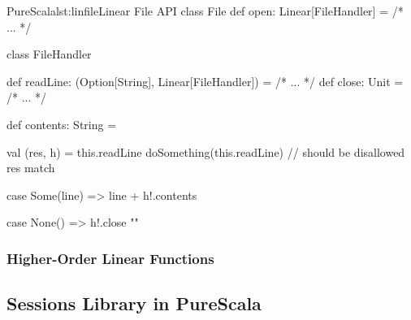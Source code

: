 \documentclass[a4paper,twoside]{article}
\newcommand{\stt}[1]{\texttt{\small{#1}}}
\begin{document}
\begin{Code}{PureScala}{lst:linfile}{Linear File API}
class File {
  def open: Linear[FileHandler] = /* ... */
}

class FileHandler {
  def readLine: (Option[String], Linear[FileHandler]) = /* ... */
  def close: Unit = /* ... */
  
  def contents: String = {
    val (res, h) = this.readLine
    doSomething(this.readLine) // should be disallowed
    res match {
      case Some(line) =>
        line + h!.contents

      case None() =>
        h!.close
        ""
    }
  }
}
\end{Code}

\subsubsection{Higher-Order Linear Functions}



% 
%
%
%

\subsection{Sessions Library in PureScala}
\label{sessions_lib}
\end{document}
